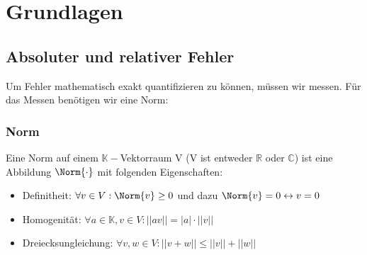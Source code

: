 \section{Grundlagen}
	\subsection{Absoluter und relativer Fehler}
		Um Fehler mathematisch exakt quantifizieren zu können, müssen wir messen. Für das
		Messen benötigen wir eine Norm:
		
		\subsubsection{Norm}
			Eine Norm auf einem $ \mathbb{K}-$Vektorraum V (V ist entweder $ \mathbb{R} $ oder $ \mathbb{C} $) ist eine Abbildung $ \Norm{\cdot} $ mit folgenden Eigenschaften:
			\begin{itemize}
				\item Definitheit: $\forall v \in V: \Norm{v} \geq 0 $ und dazu $ \Norm{v} = 0 \leftrightarrow v = 0 $
				\item Homogenität: $\forall a \in \mathbb{K}, v \in V: ||av|| = |a| \cdot ||v|| $
				\item Dreiecksungleichung: $ \forall v,w \in V: ||v+w|| \leq ||v|| + ||w||$
			\end{itemize}